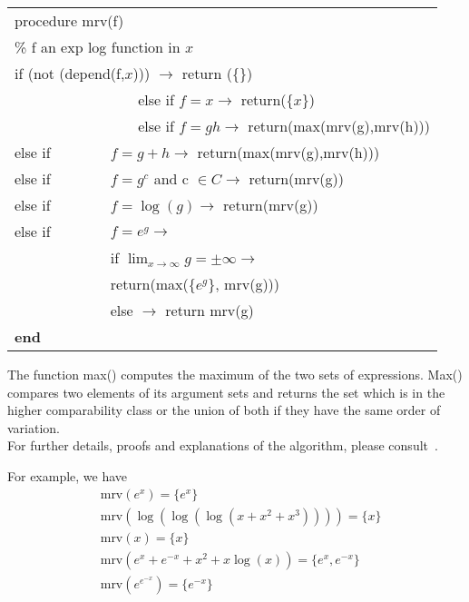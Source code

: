 \begin{tabular}{@{}l@{}l@{}l}
  \multicolumn{2}{l}{procedure mrv(f)} & \\
  \multicolumn{3}{l}{\% f an exp log function in $x$} \\
  \multicolumn{3}{l}{if (not (depend(f,$x$))) $\rightarrow$ return (\{\})} \\
          &                            & else if $f=x \rightarrow$ return(\{$x$\}) \\
          &                            & else if $f=gh \rightarrow$ return(max(mrv(g),mrv(h))) \\
  else if & \multicolumn{2}{l}{$f=g+h \rightarrow$ return(max(mrv(g),mrv(h)))} \\
  else if & \multicolumn{2}{l}{$f=g^{c}$ and c $\in C \rightarrow$ return(mrv(g))} \\
  else if & \multicolumn{2}{l}{$f=\log(g) \rightarrow$ return(mrv(g))} \\
  else if & \multicolumn{2}{l}{$f=e^{g} \rightarrow$} \\
          & \multicolumn{2}{l}{if $\lim_{x \rightarrow \infty} g=\pm\infty \rightarrow$} \\
          & \multicolumn{2}{l}{return(max(\{$e^{g}$\}, mrv(g)))} \\
          & \multicolumn{2}{l}{else $\rightarrow$ return mrv(g)} \\
  \textbf{end}
\end{tabular}

The function max() computes the maximum of the two sets of expressions. Max() compares two elements of its argument sets and returns the set which is in the higher comparability class or the union of both if they have the same order of variation. \\[\baselineskip]
%
For further details, proofs and explanations of the algorithm, please consult~\cite{Gruntz:96}.

For example, we have
\begin{align*}
&\text{mrv}(e^{x})=\{e^x\} \\
&\text{mrv}(\log(\log(\log(x+x^2+x^3))))=\{x\}  \\
&\text{mrv}(x)=\{x\} \\
&\text{mrv}(e^x+e^{-x}+x^2+x \log(x))= \{e^x,e^{-x} \} \\
&\text{mrv}(e^{e^{-x}})=\{e^{-x} \}
\end{align*}

